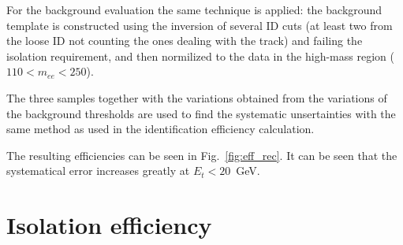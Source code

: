 For the background evaluation the same technique is applied: the background template is constructed using the inversion of several ID cuts (at least two from the loose ID not counting the ones dealing with the track) and failing the isolation requirement, and then normilized to the data in the high-mass region ($110 < m_{ee} < 250$).

The three samples together with the variations obtained from the variations of the background thresholds are used to find the systematic unsertainties with the same method as used in the identification efficiency calculation.

The resulting efficiencies can be seen in Fig.~\ref{fig:eff_rec}. It can be seen that the systematical error increases greatly at $E_{t} < 20$~GeV.

\begin{figure}
\end{figure}

\section{Isolation efficiency}

